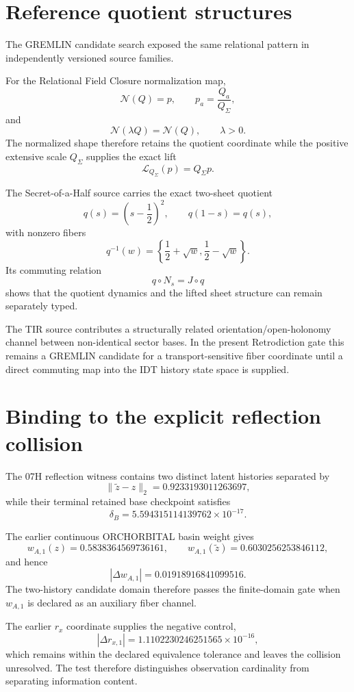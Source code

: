 \section{Reference quotient structures}

The GREMLIN candidate search exposed the same relational pattern in independently versioned source families.

For the Relational Field Closure normalization map,
\[
\mathcal N(Q)=p,
\qquad
p_a=\frac{Q_a}{Q_\Sigma},
\]
and
\[
\mathcal N(\lambda Q)=\mathcal N(Q),
\qquad \lambda>0.
\]
The normalized shape therefore retains the quotient coordinate while the positive extensive scale $Q_\Sigma$ supplies the exact lift
\[
\mathcal L_{Q_\Sigma}(p)=Q_\Sigma p.
\]

The Secret-of-a-Half source carries the exact two-sheet quotient
\[
q(s)=\left(s-\frac12\right)^2,
\qquad
q(1-s)=q(s),
\]
with nonzero fibers
\[
q^{-1}(w)
=\left\{
\frac12+\sqrt w,
\frac12-\sqrt w
\right\}.
\]
Its commuting relation
\[
q\circ N_s=J\circ q
\]
shows that the quotient dynamics and the lifted sheet structure can remain separately typed.

The TIR source contributes a structurally related orientation/open-holonomy channel between non-identical sector bases.  In the present Retrodiction gate this remains a GREMLIN candidate for a transport-sensitive fiber coordinate until a direct commuting map into the IDT history state space is supplied.

\section{Binding to the explicit reflection collision}

The 07H reflection witness contains two distinct latent histories separated by
\[
\|\widetilde z-z\|_2
=0.9233193011263697,
\]
while their terminal retained base checkpoint satisfies
\[
\delta_B
=5.594315114139762\times10^{-17}.
\]

The earlier continuous ORCHORBITAL basin weight gives
\[
w_{A,1}(z)=0.5838364569736161,
\qquad
w_{A,1}(\widetilde z)=0.6030256253846112,
\]
and hence
\[
\boxed{
|\Delta w_{A,1}|=0.01918916841099516.
}
\]
The two-history candidate domain therefore passes the finite-domain gate when $w_{A,1}$ is declared as an auxiliary fiber channel.

The earlier $r_x$ coordinate supplies the negative control,
\[
|\Delta r_{x,1}|
=1.1102230246251565\times10^{-16},
\]
which remains within the declared equivalence tolerance and leaves the collision unresolved.  The test therefore distinguishes observation cardinality from separating information content.

